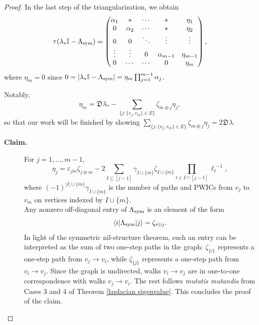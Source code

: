 \documentclass{article}
\theoremstyle{definition}
\newcommand{\zdu}{\mathfrak{D}\mspace{1mu}}
\newcommand{\mI}{\mathbb{I}}
\numberwithin{equation}{section}
\begin{document}
\begin{proof}
In the last step of the triangularization, we obtain \begin{equation}\label{triangular form of symmetric laplacian}
\tau(\lambda_*\mI-\Lambda_{\rm sym})=\left(\begin{matrix}
\alpha_1&*&\cdots&*&\eta_1\\
0&\alpha_2&\cdots&*&\eta_2\\
0&0&\ddots&\vdots&\vdots\\
\vdots&\vdots&0&\alpha_{m-1}&\eta_{m-1}\\
0&\cdots&\cdots&0&\eta_m
\end{matrix}\right),  
 \end{equation}
where $\eta_m=0$ since $0=|\lambda_*\mI-\Lambda_{\rm sym}|=\eta_m\prod_{j=1}^{m-1}\alpha_j$. 

Notably, \begin{equation}\label{last eta}
 \eta_m=\zdu\lambda_*-\sum_{\{j: \{v_j,v_m\}\in E\}}\zeta_{m\oplus j}\eta_j,
 \end{equation}
so that our work will be finished by showing $\sum_{\{j: \{v_j,v_m\}\in E\}}\zeta_{m\oplus j}\eta_j = 2\zdu\lambda$.

\begin{description}
\item [{\bf Claim.}] For $j=1, \ldots, m-1$, 
\begin{equation}\label{eta claim}
\eta_j=\varepsilon_{jm}\zeta_{j\oplus m}-2\sum_{I\subseteq [j-1]}\gamma_{I\cup\{m\}}\zeta_{I\cup\{m\}}\prod_{t\in I\cap[j-1]}{\ell_t}^{-1},
\end{equation}
where $(-1)^{|I|\cup\{m\}}\gamma_{I\cup\{m\}}$ is the number of paths and PWICs from $v_j$ to $v_m$ on vertices indexed by $I\cup\{m\}$. 
\\

Any nonzero off-diagonal entry of $\Lambda_{\rm sym}$ is an element of the form
\begin{equation*}
\langle i\vert\Lambda_{\rm sym}\vert j\rangle = \zeta_{i\oplus j}.
\end{equation*}
In light of the symmetric nil-structure theorem, such an entry can be interpreted as the sum of two one-step paths in the graph: $\zeta_{\{i\}}$ represents a one-step path from $v_j\to v_i$, while $\zeta_{\{j\}}$ represents a one-step path from $v_i\to v_j$.  Since the graph is undirected, walks $v_i\to v_j$ are in one-to-one correspondence with walks $v_j\to v_i$.  The rest follows {\em mutatis mutandis} from Cases 3 and 4 of Theorem \ref{laplacian eigenvalue}.  This concludes the proof of the claim.
\end{description}


\end{proof}
\end{document}
